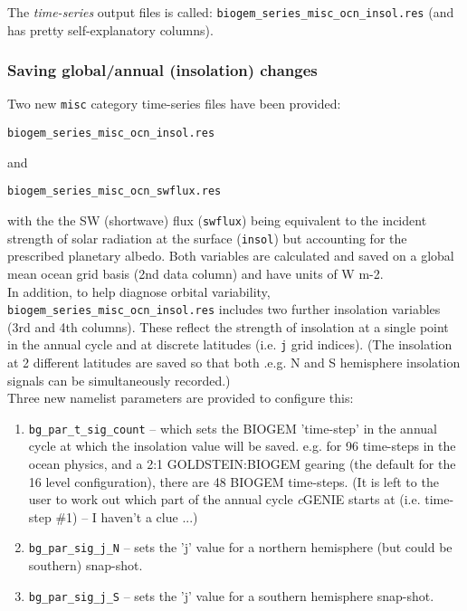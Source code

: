 \documentclass[11pt,fleqn]{book} %
\begin{document}
The \textit{time-series} output files is called: \texttt{biogem\_series\_misc\_ocn\_insol.res} (and has pretty self-explanatory columns).

%
\subsubsection{Saving global/annual (insolation) changes}

\vspace{1mm}
Two new \texttt{misc} category time-series files have been provided:
\vspace{-1mm}\begin{verbatim}biogem_series_misc_ocn_insol.res\end{verbatim}\vspace{-1mm}
and
\vspace{-1mm}\begin{verbatim}biogem_series_misc_ocn_swflux.res\end{verbatim}\vspace{-1mm}
with the the SW (shortwave) flux (\texttt{swflux}) being equivalent to the incident strength of solar radiation at the surface (\texttt{insol}) but accounting for the prescribed planetary albedo. Both variables are calculated and saved on a global mean ocean grid basis (2nd data column) and have units of W m-2.
\\In addition, to help diagnose orbital variability, \texttt{biogem\_series\_misc\_ocn\_insol.res} includes two further insolation variables (3rd and 4th columns). These reflect the strength of insolation at a single point in the annual cycle and at discrete latitudes (i.e. \texttt{j} grid indices). (The insolation at 2 different latitudes are saved so that both .e.g. N and S hemisphere insolation signals can be simultaneously recorded.)
\\Three new namelist parameters are provided to configure this:

\begin{enumerate}[noitemsep]

\item \texttt{bg\_par\_t\_sig\_count} -- which sets the BIOGEM 'time-step' in the annual cycle at which the insolation value will be saved. e.g. for 96 time-steps in the ocean physics, and a 2:1 GOLDSTEIN:BIOGEM gearing (the default for the 16 level configuration), there are 48 BIOGEM time-steps. (It is left to the user to work out which part of the annual cycle \textit{c}GENIE starts at (i.e. time-step \#1) -- I haven't a clue ...)

\item \texttt{bg\_par\_sig\_j\_N} -- sets the 'j' value for a northern hemisphere (but could be southern) snap-shot.

\item \texttt{bg\_par\_sig\_j\_S} -- sets the 'j' value for a southern hemisphere snap-shot.

\end{enumerate}
\end{document}
